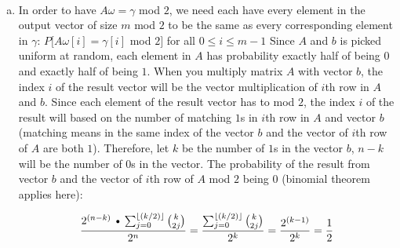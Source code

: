 \documentclass[11pt]{article}%
\begin{document}
\begin{questions}[1]
\begin{enumerate}
    \end{enumerate}
    \\
    \item   
    \begin{enumerate}[(a)]
    \item In order to have $A \omega = \gamma$ mod $2$, we need each have every element in the output vector of size $m$ mod $2$ to be the same as every corresponding element in $\gamma$:
    \newline
    \newline 
        $ P[A\omega[i] = \gamma[i]$ mod $2] $ for all $0 \leq i \leq m-1$
    \newline
    \newline
    Since $A$ and $b$ is picked uniform at random, each element in $A$ has probability exactly half of being $0$ and exactly half of being $1$. When you multiply matrix $A$ with vector $b$, the index $i$ of the result vector will be the vector multiplication of $i$th row in $A$ and $b$. Since each element of the result vector has to mod $2$, the index $i$ of the result will based on the number of matching $1$s in $i$th row in $A$ and vector $b$(matching means in the same index of the vector $b$ and the vector of $i$th row of $A$ are both $1$). 
    \newline
    Therefore, let $k$ be the number of $1$s in the vector $b$, $n-k$ will be the number of $0$s in the vector. The probability of the result from vector $b$ and the vector of $i$th row of $A$ mod $2$ being $0$ (binomial theorem applies here):
    
    $$\frac {2^{(n-k)}\Cdot\sum_{j=0}^{\floor{(k/2)}}{k\choose 2j }}{2^n} = \frac {\sum_{j=0}^{\floor{(k/2)}}{k\choose 2j }}{2^k} = \frac{2^{(k-1)}}{2^k} = \frac{1}{2}$$
    

\end{enumerate}
\end{questions}
\end{document}
